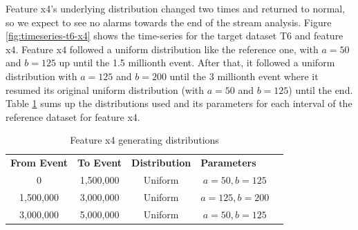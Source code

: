 Feature x4's underlying distribution changed two times and returned to normal, so we expect to see no alarms towards the end of the stream analysis. Figure \ref{fig:timeseries-t6-x4} shows the time-series for the target dataset T6 and feature x4. Feature x4 followed a uniform distribution like the reference one, with $a=50$ and $b=125$ up until the 1.5 millionth event. After that, it followed a uniform distribution with $a=125$ and $b=200$ until the 3 millionth event where it resumed its original uniform distribution (with $a=50$ and $b=125$) until the end. Table \ref{tbl:multi-feat-x4-changes} sums up the distributions used and its parameters for each interval of the reference dataset for feature x4.
\begin{table}[!htb]
    \begin{center}
    \begin{tabular}{|c|c|c|c|l}
    \cline{1-4}
    \textbf{From Event} & \textbf{To Event} & \textbf{Distribution} & \multicolumn{1}{l|}{\textbf{Parameters}} &  \\ \cline{1-4}
    0                   & 1,500,000         & Uniform               & $a=50, b=125$                            &  \\ \cline{1-4}
    1,500,000           & 3,000,000         & Uniform               & $a=125, b=200$                           &  \\ \cline{1-4}
    3,000,000           & 5,000,000         & Uniform               & $a=50, b=125$                            &  \\ \cline{1-4}
    \end{tabular}
    \end{center}
    \caption{Feature x4 generating distributions}
    \label{tbl:multi-feat-x4-changes}
\end{table}


